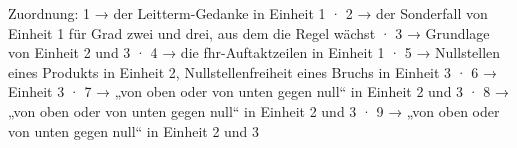 
Zuordnung: 1 → der Leitterm-Gedanke in Einheit 1 · 2 → der Sonderfall von Einheit 1 für Grad zwei und drei, aus dem die Regel wächst · 3 → Grundlage von Einheit 2 und 3 · 4 → die fhr-Auftaktzeilen in Einheit 1 · 5 → Nullstellen eines Produkts in Einheit 2, Nullstellenfreiheit eines Bruchs in Einheit 3 · 6 → Einheit 3 · 7 → „von oben oder von unten gegen null“ in Einheit 2 und 3 · 8 → „von oben oder von unten gegen null“ in Einheit 2 und 3 · 9 → „von oben oder von unten gegen null“ in Einheit 2 und 3

